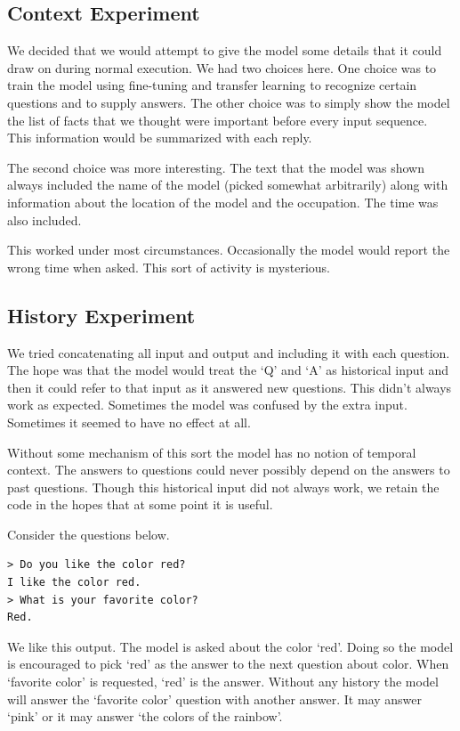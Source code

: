 \subsection{Context Experiment}
We decided that we would attempt to give the model some details that it could draw on during normal execution. We had two choices here. One choice was to train the model using fine-tuning and transfer learning to recognize certain questions and to supply answers. The other choice was to simply show the model the list of facts that we thought were important before every input sequence. This information would be summarized with each reply.

The second choice was more interesting. The text that the model was shown always included the name of the model (picked somewhat arbitrarily) along with information about the location of the model and the occupation. The time was also included.

This worked under most circumstances. Occasionally the model would report the wrong time when asked. This sort of activity is mysterious.

\subsection{History Experiment}
We tried concatenating all input and output and including it with each question. The hope was that the model would treat the `Q' and `A' as historical input and then it could refer to that input as it answered new questions. This didn't always work as expected. Sometimes the model was confused by the extra input. Sometimes it seemed to have no effect at all.

Without some mechanism of this sort the model has no notion of temporal context. The answers to questions could never possibly depend on the answers to past questions. Though this historical input did not always work, we retain the code in the hopes that at some point it is useful.

Consider the questions below.
\begin{verbatim}
> Do you like the color red?
I like the color red.
> What is your favorite color?
Red.
\end{verbatim}

\label{install-gpt2-history}

We like this output. The model is asked about the color `red'. Doing so the model is encouraged to pick `red' as the answer to the next question about color. When `favorite color' is requested, `red' is the answer. Without any history the model will answer the `favorite color' question with another answer. It may answer `pink' or it may answer `the colors of the rainbow'. 

